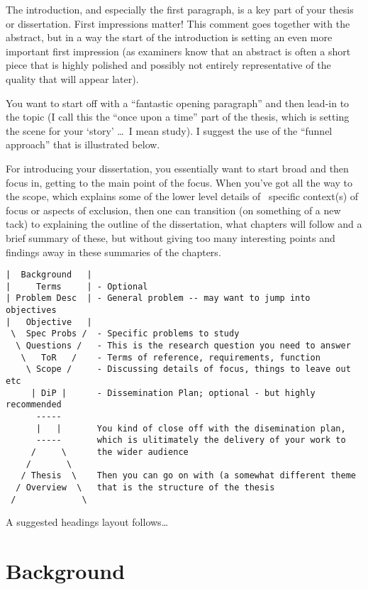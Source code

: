 The introduction, and especially the first paragraph, is a key part of your thesis or dissertation.  First impressions matter!  This comment goes together with the abstract, but in a way the start of the introduction is setting an even more important first impression (as examiners know that an abstract is often a short piece that is highly polished and possibly not entirely representative of the quality that will appear later).

You want to start off with a ``fantastic opening paragraph'' and then lead-in to the topic (I call this the ``once upon a time'' part of the thesis, which is setting the scene for your `story' \ldots\ I mean study). I suggest the use of the ``funnel approach'' that is illustrated below.

For introducing your dissertation, you essentially want to start broad and then focus in, getting to the main point of the focus.  When you've got all the way to the scope, which explains some of the lower level details of \eg~specific context(s) of focus or aspects of exclusion, then one can transition (on something of a new tack) to explaining the outline of the dissertation, what chapters will follow and a brief summary of these, but without giving too many interesting points and findings away in these summaries of the chapters.

\begin{minipage}[t]{\textwidth}
\begin{verbatim}
|  Background   |
|     Terms     | - Optional
| Problem Desc  | - General problem -- may want to jump into objectives
|   Objective   |
 \  Spec Probs /  - Specific problems to study
  \ Questions /   - This is the research question you need to answer
   \   ToR   /    - Terms of reference, requirements, function
    \ Scope /     - Discussing details of focus, things to leave out etc
     | DiP |      - Dissemination Plan; optional - but highly recommended
      -----
      |   |       You kind of close off with the disemination plan,
      -----       which is ulitimately the delivery of your work to
     /     \      the wider audience
    /       \
   / Thesis  \    Then you can go on with (a somewhat different theme
  / Overview  \   that is the structure of the thesis
 /             \
\end{verbatim}
\end{minipage}

{\color{red} A suggested headings layout follows\ldots}

\section{Background}


